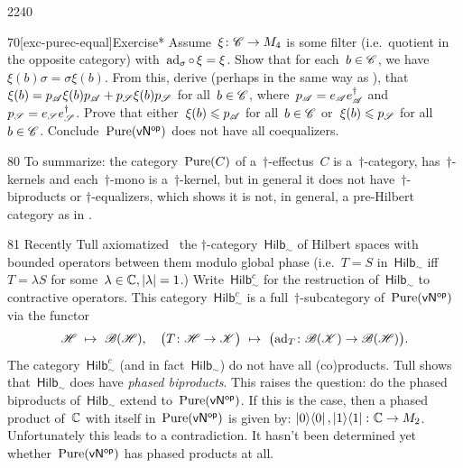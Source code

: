 \begin{parsec}{2240}
\begin{point}{70}[exc-purec-equal]{Exercise*}
Assume~$\xi \colon \mathscr{C} \to M_4$
    is some filter (i.e.~quotient in the opposite category)
    with~$\mathrm{ad}_\sigma \mathop{\circ} \xi = \xi$.
Show that for each~$b \in \mathscr{C}$,
        we have~$\xi(b) \sigma = \sigma \xi(b)$.
    From this, derive (perhaps in the same way as \cite{bags}),
    that~$\xi(b) = p_{\mathscr{A}} \xi(b) p_{\mathscr{A}}+ p_{\mathscr{S}} \xi(b) p_{\mathscr{S}}$
        for all~$b\in \mathscr{C}$,
        where~$p_{\mathscr{A}} = e_{\mathscr{A}} e_{\mathscr{A}}^\dagger$
        and~$p_{\mathscr{S}} = e_{\mathscr{S}} e_{\mathscr{S}}^\dagger$.
Prove that either~$\xi(b) \leqslant p_{\mathscr{A}}$ for all~$b\in \mathscr{C}$
    or~$\xi(b) \leqslant p_{\mathscr{S}}$ for all~$b \in \mathscr{C}$.
Conclude~$\operatorname{Pure}({\mathsf{vN}}{^{\mathsf{op}}})$ does not have all coequalizers.
\end{point}
\begin{point}{80}%
To summarize:
    the category~$\operatorname{Pure}(C)$
    of a~$\dagger$-effectus~$C$
    is a~$\dagger$-category,
    has~$\dagger$-kernels
    and each~$\dagger$-mono is a~$\dagger$-kernel,
    but in general it does not have~$\dagger$-biproducts or
        $\dagger$-equalizers,
        which shows it is not, in general,
        a pre-Hilbert category as in \cite[3.7.1]{heunenphd}.
\end{point}
\begin{point}{81}%
Recently Tull axiomatized~\cite{tull}
    the $\dagger$-category~$\mathsf{Hilb}_\sim$
        of Hilbert spaces with bounded operators between
        them modulo global phase (i.e.~$T=S$ in~$\mathsf{Hilb}_\sim$
        iff~$T = \lambda S$ for some~$\lambda \in \mathbb{C}, |\lambda|=1$.)
Write~$\mathsf{Hilb}^c_\sim$
    for the restruction of~$\mathsf{Hilb}_\sim$
    to contractive operators.
This category~$\mathsf{Hilb}^c_{\sim}$
    is a full~$\dagger$-subcategory of~$\operatorname{Pure}({\mathsf{vN}}{^{\mathsf{op}}})$
    via the functor
\begin{equation*}
    \mathscr{H} \ \mapsto \ \mathscr{B}(\mathscr{H}),  \quad
    \bigl(T\colon \mathscr{H} \to \mathscr{K}\bigr)
        \ \mapsto \ \bigl(\mathrm{ad}_T \colon \mathscr{B}(\mathscr{K}) \to \mathscr{B}(\mathscr{H})\bigr).
\end{equation*}
The category~$\mathsf{Hilb}^c_\sim$
    (and in fact~$\mathsf{Hilb}_\sim$)
    do not have all (co)products.
Tull shows that~$\mathsf{Hilb}_\sim$ does have
    \emph{phased biproducts}. \cite{tull,tull2018quotient}
This raises the question: do the phased biproducts
    of~$\mathsf{Hilb}_\sim$ extend to~$\operatorname{Pure}({\mathsf{vN}}{^{\mathsf{op}}})$.
If this is the case, then a
    phased product of~$\mathbb{C}$ with itself in~$\operatorname{Pure}({\mathsf{vN}}{^{\mathsf{op}}})$
    is given by: $\left|0\right>\!\left<0\right|, \left|1\right>\!\left<1\right|\colon \mathbb{C}  \to M_2$.
Unfortunately this leads to a contradiction.
It hasn't been determined yet whether~$\operatorname{Pure}({\mathsf{vN}}{^{\mathsf{op}}})$
    has phased products at all.
\end{point}
\end{parsec}

